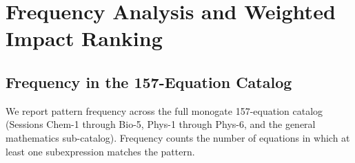 \documentclass[12pt,a4paper]{article}
\theoremstyle{definition}
\begin{document}
\section{Frequency Analysis and Weighted Impact Ranking}
\label{sec:frequency}

\subsection{Frequency in the 157-Equation Catalog}

We report pattern frequency across the full monogate 157-equation
catalog (Sessions Chem-1 through Bio-5, Phys-1 through Phys-6, and the
general mathematics sub-catalog).  Frequency counts the number of
equations in which at least one subexpression matches the pattern.
\end{document}
